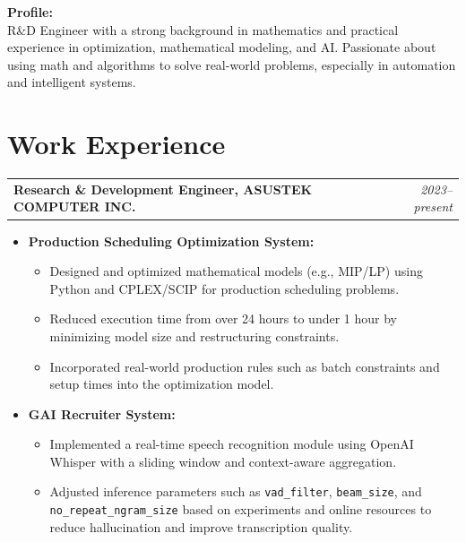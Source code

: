 \documentclass[a4paper,10pt]{article}
\begin{document}
\vspace{0.5cm}
\noindent
\textbf{Profile:} \\
R\&D Engineer with a strong background in mathematics and practical experience in optimization, mathematical modeling, and AI. Passionate about using math and algorithms to solve real-world problems, especially in automation and intelligent systems.


\vspace{0.5cm}
\section*{Work Experience}
\begin{tabularx}{\textwidth}{Xr}
    \textbf{Research \& Development Engineer, ASUSTEK COMPUTER INC.} & \textit{2023--present} \\
\end{tabularx}
\begin{itemize}[leftmargin=30pt]
    \item \textbf{Production Scheduling Optimization System:}
    \begin{itemize}
        \item Designed and optimized mathematical models (e.g., MIP/LP) using Python and CPLEX/SCIP for production scheduling problems.
        \item Reduced execution time from over 24 hours to under 1 hour by minimizing model size and restructuring constraints.
        \item Incorporated real-world production rules such as batch constraints and setup times into the optimization model.
    \end{itemize}
    \item \textbf{GAI Recruiter System:}
    \begin{itemize}
        \item Implemented a real-time speech recognition module using OpenAI Whisper with a sliding window and context-aware aggregation.
        \item Adjusted inference parameters such as \texttt{vad\_filter}, \texttt{beam\_size}, and \texttt{no\_repeat\_ngram\_size} based on experiments and online resources to reduce hallucination and improve transcription quality.
    \end{itemize}
\end{itemize}
\end{document}
